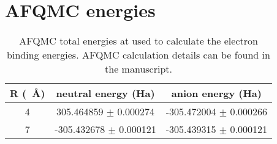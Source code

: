 \section{AFQMC energies}
\begin{table}
    \centering
    \caption{AFQMC total energies at used to calculate the electron binding energies. AFQMC calculation details can be found in the manuscript.}
\begin{tabular}[H]{ccc}
    R (\SI{}{\angstrom}) & neutral energy (Ha)     & anion energy (Ha) \\ \hline
    4     & 305.464859 $\pm$ 0.000274 & -305.472004 $\pm$ 0.000266 \\
    7     & -305.432678 $\pm$ 0.000121  &  -305.439315 $\pm$ 0.000121 \\ 
\end{tabular}
\end{table}
\newpage
